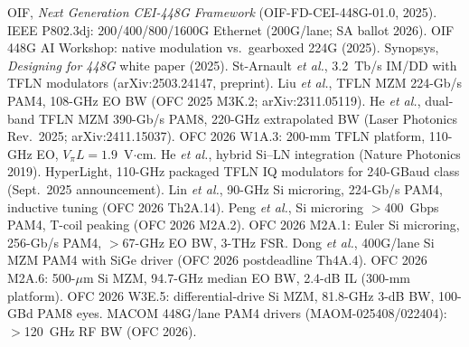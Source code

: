 \makeatletter
\newcommand{\declarecitesnip}[2]{\expandafter\gdef\csname citesnip@#1\endcsname{#2}}
\newcommand{\firstcite}[1]{%
  \begingroup
  \let\@fc@sep\@empty
  \@for\@fc@key:=#1\do{%
    \expandafter\ifx\csname fcited@\@fc@key\endcsname\relax
      \expandafter\gdef\csname fcited@\@fc@key\endcsname{}%
      \ifcsname citesnip@\@fc@key\endcsname
        \sidenote{\citehref{\@fc@key}{\csname citesnip@\@fc@key\endcsname}}%
        \citep{\@fc@key}%
      \else
        \citep{\@fc@key}%
      \fi
    \else
      \citep{\@fc@key}%
    \fi
  }%
  \endgroup
}
\makeatother

\declarecitesnip{cei448}{OIF, \emph{Next Generation CEI-448G Framework} (OIF-FD-CEI-448G-01.0, 2025).}
\declarecitesnip{ieee8023dj}{IEEE P802.3dj: 200/400/800/1600G Ethernet (200G/lane; SA ballot 2026).}
\declarecitesnip{huawei448}{OIF 448G AI Workshop: native modulation vs.\ gearboxed 224G (2025).}
\declarecitesnip{synopsys448}{Synopsys, \emph{Designing for 448G} white paper (2025).}
\declarecitesnip{tfmln32t}{St-Arnault \emph{et al.}, 3.2~Tb/s IM/DD with TFLN modulators (arXiv:2503.24147, preprint).}
\declarecitesnip{tfln224}{Liu \emph{et al.}, TFLN MZM 224-Gb/s PAM4, 108-GHz EO BW (OFC 2025 M3K.2; arXiv:2311.05119).}
\declarecitesnip{tfln390}{He \emph{et al.}, dual-band TFLN MZM 390-Gb/s PAM8, 220-GHz extrapolated BW (Laser Photonics Rev.\ 2025; arXiv:2411.15037).}
\declarecitesnip{tfln200mm}{OFC 2026 W1A.3: 200-mm TFLN platform, 110-GHz EO, $V_\pi L=1.9$~V$\cdot$cm.}
\declarecitesnip{he2019}{He \emph{et al.}, hybrid Si--LN integration (Nature Photonics 2019).}
\declarecitesnip{hyperlight110}{HyperLight, 110-GHz packaged TFLN IQ modulators for 240-GBaud class (Sept.\ 2025 announcement).}
\declarecitesnip{ring224}{Lin \emph{et al.}, 90-GHz Si microring, 224-Gb/s PAM4, inductive tuning (OFC 2026 Th2A.14).}
\declarecitesnip{ring400}{Peng \emph{et al.}, Si microring $>$400~Gbps PAM4, T-coil peaking (OFC 2026 M2A.2).}
\declarecitesnip{ring256}{OFC 2026 M2A.1: Euler Si microring, 256-Gb/s PAM4, $>$67-GHz EO BW, 3-THz FSR.}
\declarecitesnip{simzm400}{Dong \emph{et al.}, 400G/lane Si MZM PAM4 with SiGe driver (OFC 2026 postdeadline Th4A.4).}
\declarecitesnip{simzmcompact}{OFC 2026 M2A.6: 500-$\mu$m Si MZM, 94.7-GHz median EO BW, 2.4-dB IL (300-mm platform).}
\declarecitesnip{simzmdiff}{OFC 2026 W3E.5: differential-drive Si MZM, 81.8-GHz 3-dB BW, 100-GBd PAM8 eyes.}
\declarecitesnip{macom448}{MACOM 448G/lane PAM4 drivers (MAOM-025408/022404): $>$120~GHz RF BW (OFC 2026).}
